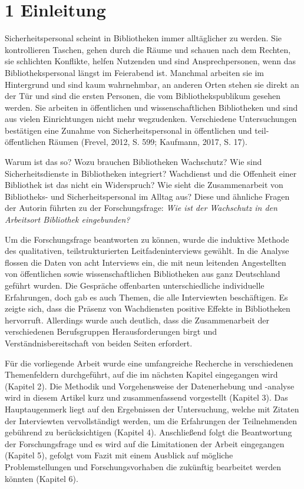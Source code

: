 \documentclass[a4paper,
fontsize=11pt,
oneside,
numbers=noperiodatend,
parskip=half-,
bibliography=totoc,
final
]{scrartcl}
\begin{document}
\hypertarget{einleitung}{%
\section{1 Einleitung}\label{einleitung}}

Sicherheitspersonal scheint in Bibliotheken immer alltäglicher zu
werden. Sie kontrollieren Taschen, gehen durch die Räume und schauen
nach dem Rechten, sie schlichten Konflikte, helfen Nutzenden und sind
Ansprechpersonen, wenn das Bibliothekspersonal längst im Feierabend ist.
Manchmal arbeiten sie im Hintergrund und sind kaum wahrnehmbar, an
anderen Orten stehen sie direkt an der Tür und sind die ersten Personen,
die vom Bibliothekspublikum gesehen werden. Sie arbeiten in öffentlichen
und wissenschaftlichen Bibliotheken und sind aus vielen Einrichtungen
nicht mehr wegzudenken. Verschiedene Untersuchungen bestätigen eine
Zunahme von Sicherheitspersonal in öffentlichen und teil-öffentlichen
Räumen (Frevel, 2012, S. 599; Kaufmann, 2017, S. 17).

Warum ist das so? Wozu brauchen Bibliotheken Wachschutz? Wie sind
Sicherheitsdienste in Bibliotheken integriert? Wachdienst und die
Offenheit einer Bibliothek ist das nicht ein Widerspruch? Wie sieht die
Zusammenarbeit von Bibliotheks- und Sicherheitspersonal im Alltag aus?
Diese und ähnliche Fragen der Autorin führten zu der Forschungsfrage:
\emph{Wie ist der Wachschutz in den Arbeitsort Bibliothek eingebunden?}

Um die Forschungsfrage beantworten zu können, wurde die induktive
Methode des qualitativen, teilstrukturierten Leitfadeninterviews
gewählt. In die Analyse flossen die Daten von acht Interviews ein, die
mit neun leitenden Angestellten von öffentlichen sowie
wissenschaftlichen Bibliotheken aus ganz Deutschland geführt wurden. Die
Gespräche offenbarten unterschiedliche individuelle Erfahrungen, doch
gab es auch Themen, die alle Interviewten beschäftigen. Es zeigte sich,
dass die Präsenz von Wachdiensten positive Effekte in Bibliotheken
hervorruft. Allerdings wurde auch deutlich, dass die Zusammenarbeit der
verschiedenen Berufsgruppen Herausforderungen birgt und
Verständnisbereitschaft von beiden Seiten erfordert.

Für die vorliegende Arbeit wurde eine umfangreiche Recherche in
verschiedenen Themenfeldern durchgeführt, auf die im nächsten Kapitel
eingegangen wird (Kapitel 2). Die Methodik und Vorgehensweise der
Datenerhebung und -analyse wird in diesem Artikel kurz und
zusammenfassend vorgestellt (Kapitel 3). Das Hauptaugenmerk liegt auf
den Ergebnissen der Untersuchung, welche mit Zitaten der Interviewten
vervollständigt werden, um die Erfahrungen der Teilnehmenden gebührend
zu berücksichtigen (Kapitel 4). Anschließend folgt die Beantwortung der
Forschungsfrage und es wird auf die Limitationen der Arbeit eingegangen
(Kapitel 5), gefolgt vom Fazit mit einem Ausblick auf mögliche
Problemstellungen und Forschungsvorhaben die zukünftig bearbeitet werden
könnten (Kapitel 6).
\end{document}
